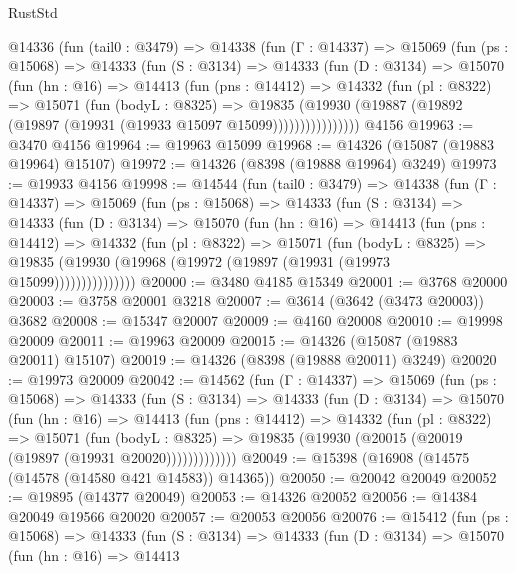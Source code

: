 \begin{lexlean}{RustStd}
\begin{coremodule}
    @14336
      (fun (tail0 : @3479) =>
      @14338
        (fun (Γ : @14337) =>
        @15069
          (fun (ps : @15068) =>
          @14333
            (fun (S : @3134) =>
            @14333
              (fun (D : @3134) =>
              @15070
                (fun (hn : @16) =>
                @14413
                  (fun (pns : @14412) =>
                  @14332
                    (fun (pl : @8322) =>
                    @15071
                      (fun (bodyL : @8325) =>
                      @19835
                        (@19930
                          (@19887 (@19892 (@19897 (@19931 (@19933 @15097 @15099))))))))))))))))
    @4156
@19963 := @3470 @4156
@19964 := @19963 @15099
@19968 := @14326 (@15087 (@19883 @19964) @15107)
@19972 := @14326 (@8398 (@19888 @19964) @3249)
@19973 := @19933 @4156
@19998 := @14544
    (fun (tail0 : @3479) =>
    @14338
      (fun (Γ : @14337) =>
      @15069
        (fun (ps : @15068) =>
        @14333
          (fun (S : @3134) =>
          @14333
            (fun (D : @3134) =>
            @15070
              (fun (hn : @16) =>
              @14413
                (fun (pns : @14412) =>
                @14332
                  (fun (pl : @8322) =>
                  @15071
                    (fun (bodyL : @8325) =>
                    @19835 (@19930 (@19968 (@19972 (@19897 (@19931 (@19973 @15099)))))))))))))))
@20000 := @3480 @4185 @15349
@20001 := @3768 @20000
@20003 := @3758 @20001 @3218
@20007 := @3614 (@3642 (@3473 @20003)) @3682
@20008 := @15347 @20007
@20009 := @4160 @20008
@20010 := @19998 @20009
@20011 := @19963 @20009
@20015 := @14326 (@15087 (@19883 @20011) @15107)
@20019 := @14326 (@8398 (@19888 @20011) @3249)
@20020 := @19973 @20009
@20042 := @14562
    (fun (Γ : @14337) =>
    @15069
      (fun (ps : @15068) =>
      @14333
        (fun (S : @3134) =>
        @14333
          (fun (D : @3134) =>
          @15070
            (fun (hn : @16) =>
            @14413
              (fun (pns : @14412) =>
              @14332
                (fun (pl : @8322) =>
                @15071
                  (fun (bodyL : @8325) =>
                  @19835 (@19930 (@20015 (@20019 (@19897 (@19931 @20020)))))))))))))
@20049 := @15398 (@16908 (@14575 (@14578 (@14580 @421 @14583)) @14365))
@20050 := @20042 @20049
@20052 := @19895 (@14377 @20049)
@20053 := @14326 @20052
@20056 := @14384 @20049 @19566 @20020
@20057 := @20053 @20056
@20076 := @15412
    (fun (ps : @15068) =>
    @14333
      (fun (S : @3134) =>
      @14333
        (fun (D : @3134) =>
        @15070
          (fun (hn : @16) =>
          @14413

\end{coremodule}
\end{lexlean}

